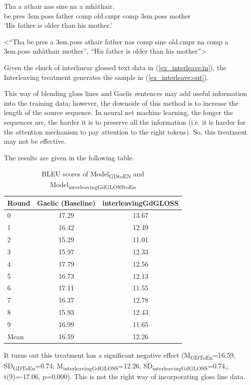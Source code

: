 \documentclass[final]{ua-thesis}
\numberwithin{equation}{section}
\begin{document}
\begin{exe} 
\ex 
	\begin{xlist}
	\ex \label{ex_interleave:in}
		\gll	 Tha a athair nas sine na a mh\`athair.\\  
     		     be.pres 3sm.poss father comp old.cmpr comp 3sm.poss mother \\
    	\glt    `His father is older than his mother.'  

    \ex \label{ex_interleave:out} <``Tha be.pres a 3sm.poss athair father nas comp sine old.cmpr na comp a 3sm.poss mh\`athair mother'', ``His father is older than his mother''>
    \end{xlist}
\end{exe}

Given the chuck of interlinear glossed text data in (\ref{ex_interleave:in}), the Interleaving treatment generates the sample in (\ref{ex_interleave:out}).  

This way of blending gloss lines and Gaelic sentences may add useful information into the training data; 
however, the downside of this method is to increase the length of the source sequence. In neural net machine learning, the longer the sequences are, the harder it is to preserve all the information (i.e. it is harder for the attention mechanism to pay attention to the right tokens). So, this treatment may not be effective. 


The results are given in the following table. 
\begin{table}[ht]
\centering
\begin{tabular}{lcc}
  \hline
Round & Gaelic (Baseline) & interleavingGdGLOSS \\ 
  \hline
0 & 17.29 & 13.67 \\ 
  1 & 16.42 & 12.49 \\ 
  2 & 15.29 & 11.01 \\ 
  3 & 15.97 & 12.33 \\ 
  4 & 17.79 & 12.56 \\ 
  5 & 16.73 & 12.13 \\ 
  6 & 17.11 & 11.55 \\ 
  7 & 16.37 & 12.78 \\ 
  8 & 15.93 & 12.43 \\ 
  9 & 16.99 & 11.65 \\ 
   \hline
Mean & 16.59 & 12.26 \\ 
   \hline
\end{tabular}
\caption{BLEU scores of Model\textsubscript{GDtoEN} and Model\textsubscript{interleavingGdGLOSStoEn}} 
\label{Table:interleavingGdGLOSS}
\end{table}\newline
It turns out this treatment has a significant negative effect
(M\textsubscript{GDToEn}=16.59, SD\textsubscript{GDToEn}=0.74; M\textsubscript{interleavingGdGLOSS}=12.26, SD\textsubscript{interleavingGdGLOSS}=0.74,; t(9)=-17.06, p=0.000). This is not the right way of incorporating gloss line data. 
\end{document}
